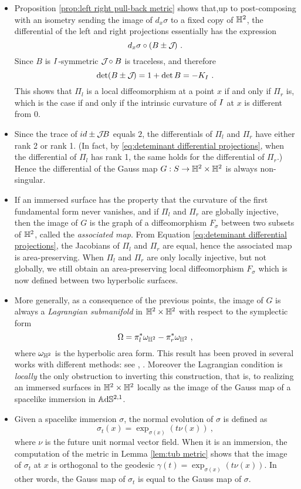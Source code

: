\begin{itemize}[leftmargin=0.5cm]
\item Proposition \ref{prop:left right pull-back metric} shows that,up to post-composing with an isometry sending the image of $d_x\sigma$ to a fixed copy of $\mathbb{H}^2$, the differential of the left and right projections essentially has the expression 
\[
    d_x\sigma\circ(B\pm\mathcal{J}\!)~.
\]
Since $B$ is $I$-symmetric $\mathcal{J}\!\circ B$ is traceless, and therefore 
\begin{equation}\label{eq:deteminant differential projections}
\det(B\pm\mathcal{J}\!)=1+\det B=-K_I~.
\end{equation}
This shows that $\Pi_l$ is a local diffeomorphism at a point $x$ if and only if $\Pi_r$ is, which is the case if and only if the intrinsic curvature of $I$ at $x$ is different from $0$.
\item Since the trace of $id\pm\mathcal{J}\! B$ equals $2$, the differentials of $\Pi_l$ and $\Pi_r$ have either rank 2 or rank 1. (In fact, by \eqref{eq:deteminant differential projections}, when the differential of $\Pi_l$ has rank 1, the same holds for the differential of $\Pi_r$.) Hence the differential of the Gauss map $G:S\to\mathbb{H}^2\times\mathbb{H}^2$ is always non-singular.
\item If an immersed surface has the property that the curvature of the first fundamental form never vanishes, and if $\Pi_l$ and $\Pi_r$ are globally injective, then the image of $G$ is the graph of a  diffeomorphism $F_\sigma$ between two subsets of $\mathbb{H}^2$,  called the \emph{associated map}. From Equation \eqref{eq:deteminant differential projections}, the Jacobians of $\Pi_l$ and $\Pi_r$ are equal, hence the associated map is area-preserving.
When $\Pi_l$ and $\Pi_r$ are only locally injective, but not globally, we still obtain an area-preserving local diffeomorphism $F_\sigma$ which is now defined between two hyperbolic surfaces.
\item More generally, as a consequence of the previous points, the image of $G$ is always a \emph{Lagrangian submanifold} in $\mathbb{H}^2\times\mathbb{H}^2$ with respect to the symplectic form 
\begin{equation} \label{eq symplectic form}
\Omega=\pi_l^*\omega_{\mathbb{H}^2}-\pi_r^*\omega_{\mathbb{H}^2}~,
\end{equation}
where $\omega_{\mathbb{H}^2}$ is the hyperbolic area form. 
This result has been proved in several works with different methods: see \cite{bonsante2017equivariant}, \cite{Seppi_2017}. Moreover the Lagrangian condition is \emph{locally} the only obstruction to inverting this construction, that is, to realizing an immersed surfaces in $\mathbb{H}^2\times\mathbb{H}^2$ locally as the image of the Gauss map of a spacelike immersion in $\mathbb{A}\mathrm{d}\mathbb{S}^{2,1}$.
\item Given a spacelike immersion $\sigma$,  the normal evolution of $\sigma$ is defined as 
\[
    \sigma_t(x)=\exp_{\sigma(x)}(t\nu(x))~,
\]
where $\nu$ is the future unit normal vector field. When it is an immersion, the computation of the metric in Lemma \ref{lem:tub metric} shows that the image of $\sigma_t$ at $x$ is orthogonal to the geodesic $\gamma(t)=\exp_{\sigma(x)}(t\nu(x))$. In other words, the Gauss map of $\sigma_t$ is equal to the Gauss map of $\sigma$. 
\end{itemize}

